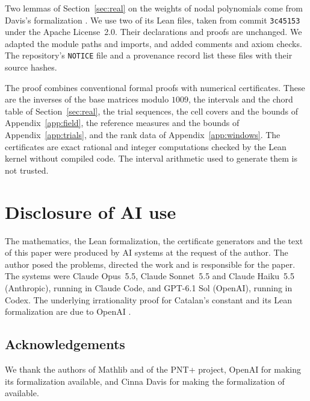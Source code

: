 Two lemmas of Section~\ref{sec:real} on the weights of nodal polynomials come from Davis's formalization
\cite{Davis2026}. We use two of its Lean files, taken from commit \texttt{3c45153} under the Apache
License~2.0. Their declarations and proofs are unchanged. We adapted the module paths and imports, and added comments and
axiom checks. The repository's \texttt{NOTICE} file and a provenance record list these files with their source
hashes.

The proof combines conventional formal proofs with numerical certificates. These are the inverses of the base
matrices modulo $1009$, the intervals and the chord table of Section~\ref{sec:real}, the trial sequences, the
cell covers and the bounds of Appendix~\ref{app:field}, the reference measures
and the bounds of Appendix~\ref{app:trials}, and the rank data of Appendix~\ref{app:windows}. The certificates are
exact rational and integer computations checked by the Lean kernel without compiled code. The interval
arithmetic used to generate them \cite{Arb} is not trusted.

\section*{Disclosure of AI use}
The mathematics, the Lean formalization, the certificate generators and the text of this paper were produced
by AI systems at the request of the author. The author posed the problems, directed the work and is
responsible for the paper. The systems were Claude Opus~5.5, Claude Sonnet~5.5 and Claude Haiku~5.5
(Anthropic), running in Claude Code, and GPT-6.1 Sol (OpenAI), running in Codex. The underlying
irrationality proof for Catalan's constant and its Lean formalization are due to OpenAI \cite{OpenAI2026}.

\subsection*{Acknowledgements}
We thank the authors of Mathlib and of the PNT+ project, OpenAI for making its formalization available, and
Cinna Davis for making the formalization of \cite{Davis2026} available.
